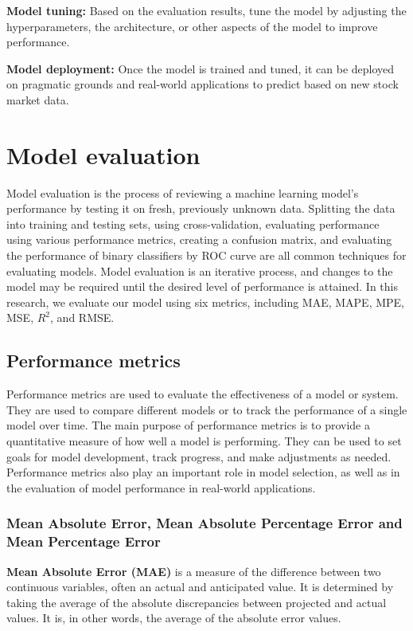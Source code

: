 \documentclass[a4paper]{article}
\begin{document}
\textbf{Model tuning:} Based on the evaluation results, tune the model by adjusting the hyperparameters, the architecture, or other aspects of the model to improve performance.

\textbf{Model deployment:} Once the model is trained and tuned, it can be deployed on pragmatic grounds and real-world applications to predict based on new stock market data.
\section{Model evaluation}

Model evaluation is the process of reviewing a machine learning model's performance by testing it on fresh, previously unknown data. Splitting the data into training and testing sets, using cross-validation, evaluating performance using various performance metrics, creating a confusion matrix, and evaluating the performance of binary classifiers by ROC curve are all common techniques for evaluating models. Model evaluation is an iterative process, and changes to the model may be required until the desired level of performance is attained. In this research, we evaluate our model using six metrics, including MAE, MAPE, MPE, MSE, $R^2$, and RMSE.
\subsection{Performance metrics}
Performance metrics are used to evaluate the effectiveness of a model or system. They are used to compare different models or to track the performance of a single model over time. The main purpose of performance metrics is to provide a quantitative measure of how well a model is performing. They can be used to set goals for model development, track progress, and make adjustments as needed. Performance metrics also play an important role in model selection, as well as in the evaluation of model performance in real-world applications.
\subsubsection{Mean Absolute Error, Mean Absolute Percentage Error and Mean Percentage Error}
\textbf{Mean Absolute Error (MAE)} is a measure of the difference between two continuous variables, often an actual and anticipated value. It is determined by taking the average of the absolute discrepancies between projected and actual values. It is, in other words, the average of the absolute error values.
\end{document}
